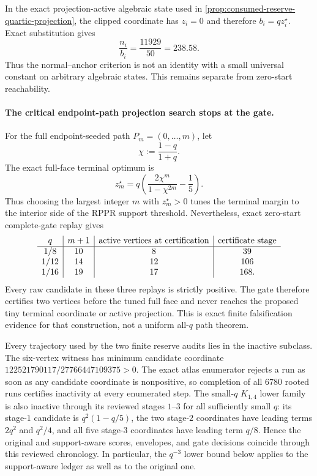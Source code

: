 In the exact projection-active algebraic state used in
\cref{prop:consumed-reserve-quartic-projection}, the clipped coordinate has
$z_i=0$ and therefore $b_i=qz_i^\star$.  Exact substitution gives
\begin{equation}
 \frac{n_i}{b_i}=\frac{11929}{50}=238.58.
 \label{eq:projection-normal-algebraic-ratio}
\end{equation}
Thus the normal--anchor criterion is not an identity with a small universal
constant on arbitrary algebraic states.  This remains separate from
zero-start reachability.

\paragraph{The critical endpoint-path projection search stops at the gate.}
For the full endpoint-seeded path $P_m=(0,\ldots,m)$, let
\[
 \chi:=\frac{1-q}{1+q}.
\]
The exact full-face terminal optimum is
\begin{equation}
 z_m^\star
 =q\left(\frac{2\chi^m}{1-\chi^{2m}}-\frac15\right).
 \label{eq:critical-path-terminal-optimum}
\end{equation}
Thus choosing the largest integer $m$ with $z_m^\star>0$ tunes the terminal
margin to the interior side of the RPPR support threshold.  Nevertheless,
exact zero-start complete-gate replay gives
\begin{equation*}
\begin{array}{c|c|c|c}
q& m+1&\hbox{active vertices at certification}&\hbox{certificate stage}\\
\hline
1/8&10&8&39\\
1/12&14&12&106\\
1/16&19&17&168.
\end{array}
\end{equation*}
Every raw candidate in these three replays is strictly positive.  The gate
therefore certifies two vertices before the tuned full face and never reaches
the proposed tiny terminal coordinate or active projection.  This is exact
finite falsification evidence for that construction, not a uniform
all-$q$ path theorem.

Every trajectory used by the two finite reserve audits lies in the inactive
subclass.  The six-vertex witness has minimum candidate coordinate
$122521790117/27766447109375>0$.  The exact atlas enumerator rejects a run as
soon as any candidate coordinate is nonpositive, so completion of all $6780$
rooted runs certifies inactivity at every enumerated step.  The small-$q$
$K_{1,4}$ lower family is also inactive through its reviewed stages $1$--$3$
for all sufficiently small $q$: its stage-$1$ candidate is
$q^2(1-q/5)$, the two stage-$2$ coordinates have leading terms $2q^2$ and
$q^2/4$, and all five stage-$3$ coordinates have leading term $q/8$.  Hence
the original and support-aware scores, envelopes, and gate decisions coincide
through this reviewed chronology.  In particular, the $q^{-3}$ lower bound
below applies to the support-aware ledger as well as to the original one.

